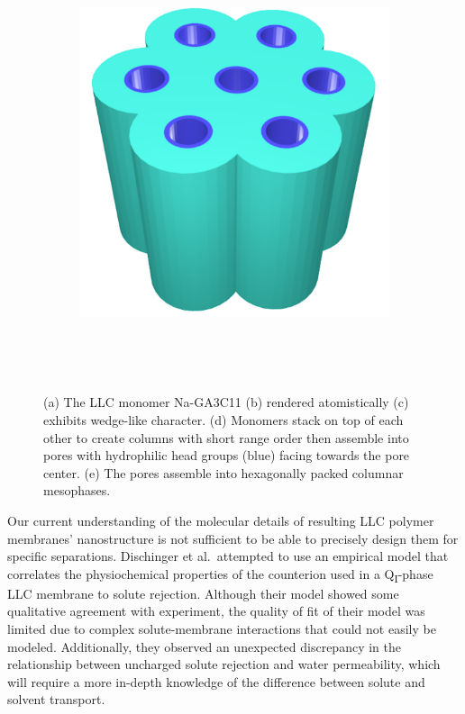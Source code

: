 \documentclass[journal=jpcbfk,manuscript=article]{achemso}
\begin{document}
\begin{figure}
\begin{subfigure}{0.4\linewidth}
		\caption{}~\label{fig:wedge_layer}
	\end{subfigure}
	\begin{subfigure}{0.4\linewidth}
		\centering
		\includegraphics[width=\textwidth]{hexagonal_packing.pdf}
		\caption{}~\label{fig:hex_packing_simple}
	\end{subfigure}
	\caption{(a) The LLC monomer Na-GA3C11 (b) rendered atomistically (c)
	exhibits wedge-like character. (d) Monomers stack on top of each other to
	create columns with short range order then assemble into pores with  
	hydrophilic head groups (blue) facing towards the pore center. (e) The 
	pores assemble into hexagonally packed columnar mesophases.}~\label{fig:assembly}
  \end{figure}


  Our current understanding of the molecular details of resulting LLC polymer membranes'
  nanostructure is not sufficient to be able to precisely design them for
  specific separations. Dischinger et al.~attempted to use an empirical model
  that correlates the physiochemical properties of the counterion used in a 
  Q\textsubscript{I}-phase LLC membrane to solute rejection\cite{dischinger_effect_2017}.
  Although their model showed some qualitative agreement with experiment, the
  quality of fit of their model was limited due to complex solute-membrane 
  interactions that could not easily be modeled. Additionally, they observed
  an unexpected discrepancy in the relationship between uncharged solute
  rejection and water permeability, which will require a more in-depth knowledge of
  the difference between solute and solvent transport.
  
\end{document}
